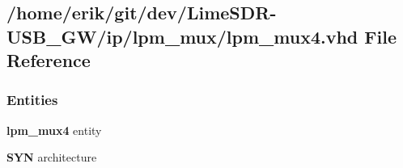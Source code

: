 \subsection{/home/erik/git/dev/\+Lime\+S\+D\+R-\/\+U\+S\+B\+\_\+\+G\+W/ip/lpm\+\_\+mux/lpm\+\_\+mux4.vhd File Reference}
\label{lpm__mux4_8vhd}
\subsubsection*{Entities}
\begin{DoxyCompactItemize}
\item 
{\bf lpm\+\_\+mux4} entity
\item 
{\bf S\+YN} architecture
\end{DoxyCompactItemize}
